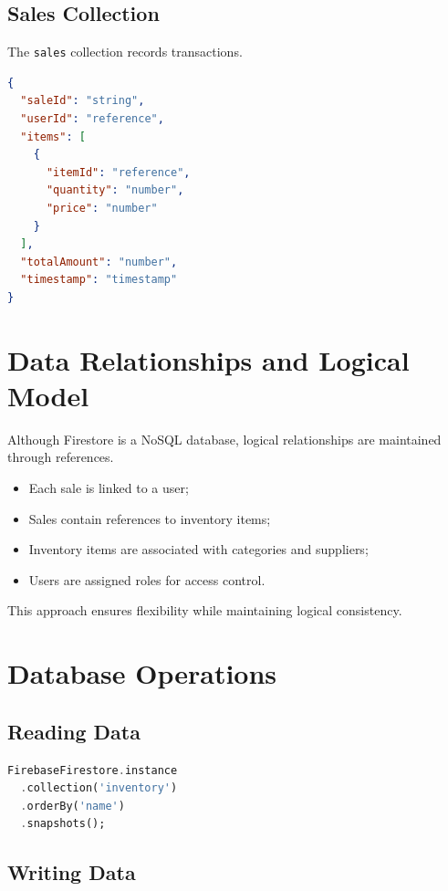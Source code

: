 \subsection{Sales Collection}

The \texttt{sales} collection records transactions.

\begin{lstlisting}[language=JSON, caption=Sales Document Structure]
{
  "saleId": "string",
  "userId": "reference",
  "items": [
    {
      "itemId": "reference",
      "quantity": "number",
      "price": "number"
    }
  ],
  "totalAmount": "number",
  "timestamp": "timestamp"
}
\end{lstlisting}

\section{Data Relationships and Logical Model}

Although Firestore is a NoSQL database, logical relationships are maintained through references.

\begin{itemize}
    \item Each sale is linked to a user;
    \item Sales contain references to inventory items;
    \item Inventory items are associated with categories and suppliers;
    \item Users are assigned roles for access control.
\end{itemize}

This approach ensures flexibility while maintaining logical consistency.

\section{Database Operations}

\subsection{Reading Data}

\begin{lstlisting}[language=Dart]
FirebaseFirestore.instance
  .collection('inventory')
  .orderBy('name')
  .snapshots();
\end{lstlisting}

\subsection{Writing Data}

